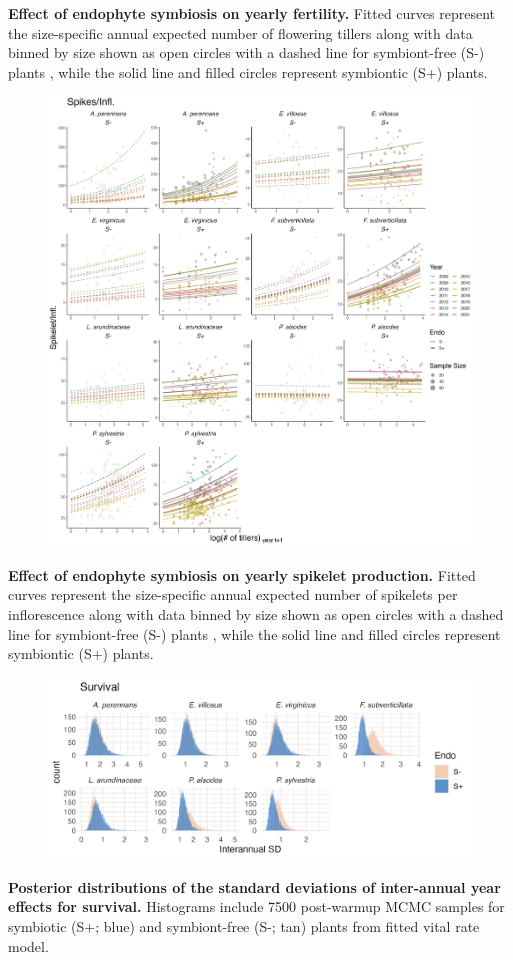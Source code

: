 \documentclass[12pt]{article}
\begin{document}
 \textbf{Effect of endophyte symbiosis on yearly fertility.} Fitted curves represent the size-specific annual expected number of flowering tillers along with data binned by size shown as open circles with a dashed line for symbiont-free (S-) plants , while the solid line and filled circles represent symbiontic (S+) plants. 
\newpage
\begin{figure}[H]
	\centering
	\includegraphics[width=\linewidth]{spike_yearplot.png}
\end{figure}
 \textbf{Effect of endophyte symbiosis on yearly spikelet production.} Fitted curves represent the size-specific annual expected number of spikelets per inflorescence along with data binned by size shown as open circles with a dashed line for symbiont-free (S-) plants , while the solid line and filled circles represent symbiontic (S+) plants.
\newpage


\begin{figure}[H]
	\centering
	\includegraphics[width=.9\linewidth]{surv_sigmayear_hist.png}
\end{figure}
 \textbf{Posterior distributions of the standard deviations of inter-annual year effects for survival.} Histograms include 7500 post-warmup MCMC samples for symbiotic (S+; blue) and symbiont-free (S-; tan) plants from fitted vital rate model.
\end{document}
